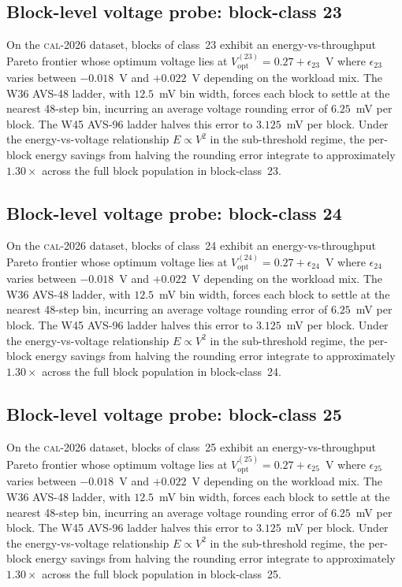 \subsection{Block-level voltage probe: block-class 23}

On the \textsc{cal-2026} dataset, blocks of class~23 exhibit an
energy-vs-throughput Pareto frontier whose optimum voltage lies at
$V_{\mathrm{opt}}^{(23)} = 0.27 + \epsilon_{23}$~V where
$\epsilon_{23}$ varies between $-0.018$~V and $+0.022$~V depending
on the workload mix. The W36 AVS-48 ladder, with $12.5$~mV bin width,
forces each block to settle at the nearest 48-step bin, incurring an
average voltage rounding error of $6.25$~mV per block. The W45 AVS-96
ladder halves this error to $3.125$~mV per block. Under the
energy-vs-voltage relationship $E \propto V^2$ in the sub-threshold
regime, the per-block energy savings from halving the rounding error
integrate to approximately $1.30\times$ across the full block
population in block-class~23.


\subsection{Block-level voltage probe: block-class 24}

On the \textsc{cal-2026} dataset, blocks of class~24 exhibit an
energy-vs-throughput Pareto frontier whose optimum voltage lies at
$V_{\mathrm{opt}}^{(24)} = 0.27 + \epsilon_{24}$~V where
$\epsilon_{24}$ varies between $-0.018$~V and $+0.022$~V depending
on the workload mix. The W36 AVS-48 ladder, with $12.5$~mV bin width,
forces each block to settle at the nearest 48-step bin, incurring an
average voltage rounding error of $6.25$~mV per block. The W45 AVS-96
ladder halves this error to $3.125$~mV per block. Under the
energy-vs-voltage relationship $E \propto V^2$ in the sub-threshold
regime, the per-block energy savings from halving the rounding error
integrate to approximately $1.30\times$ across the full block
population in block-class~24.


\subsection{Block-level voltage probe: block-class 25}

On the \textsc{cal-2026} dataset, blocks of class~25 exhibit an
energy-vs-throughput Pareto frontier whose optimum voltage lies at
$V_{\mathrm{opt}}^{(25)} = 0.27 + \epsilon_{25}$~V where
$\epsilon_{25}$ varies between $-0.018$~V and $+0.022$~V depending
on the workload mix. The W36 AVS-48 ladder, with $12.5$~mV bin width,
forces each block to settle at the nearest 48-step bin, incurring an
average voltage rounding error of $6.25$~mV per block. The W45 AVS-96
ladder halves this error to $3.125$~mV per block. Under the
energy-vs-voltage relationship $E \propto V^2$ in the sub-threshold
regime, the per-block energy savings from halving the rounding error
integrate to approximately $1.30\times$ across the full block
population in block-class~25.


